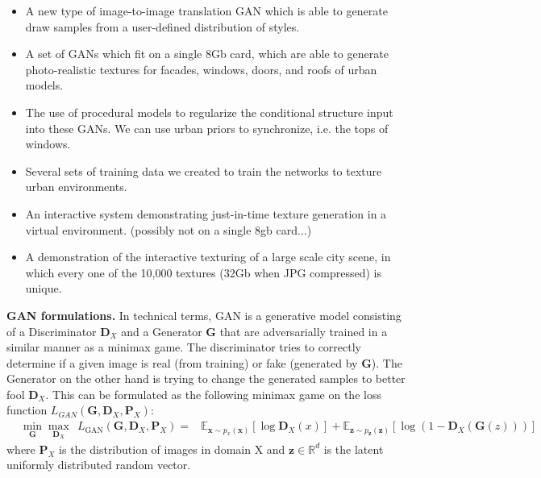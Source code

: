 \begin{itemize}
    \item A new type of image-to-image translation GAN which is able to generate draw samples from a user-defined distribution of styles.
    \item A set of GANs which fit on a single 8Gb card, which are able to generate photo-realistic textures for facades, windows, doors, and roofs of urban models. 
    \item The use of procedural models to regularize the conditional structure input into these GANs. We can use urban priors to synchronize, i.e. the tops of windows.
    \item Several sets of training data we created to train the networks to texture urban environments.
    \item An interactive system demonstrating just-in-time texture generation in a virtual environment. (possibly not on a single 8gb card...)
    \item A demonstration of the interactive texturing of a large scale city scene, in which every one of the 10,000 textures (32Gb when JPG compressed) is unique.
\end{itemize}

\vspace{1in}

{\bf GAN formulations.}
In technical terms, GAN is a generative model consisting of a Discriminator $\mathbf{D}_{X}$ and a Generator $\mathbf{G}$ that are adversarially trained in a similar manner as a minimax game. The discriminator tries to correctly determine if a given image is real (from training) or fake (generated by $\mathbf{G}$). The Generator on the other hand is trying to change the generated samples to better fool $\mathbf{D}_{X}$. This can be formulated as the following minimax game on the loss function $\mathbf{\mathit{L}}_{GAN}(\mathbf{G},\mathbf{D}_{X},\mathbf{P}_{X})$: 
\begin{equation}
\begin{aligned}
&
\min_{\mathbf{G}} \max_{\mathbf{D}_{X}}~~\mathbf{\mathit{L}}_{\text{GAN}}(\mathbf{G},\mathbf{D}_{X},\mathbf{P}_{X})=  
& \mathbb{E}_{\mathbf{x}\sim p_{x}(\mathbf{x})} [\log \mathbf{D}_{X}(x)] +  \mathbb{E}_{\mathbf{z}\sim p_{\mathbf{z}}(\mathbf{z})} [\log (1- \mathbf{D}_{X}(\mathbf{G}(z)))]
\end{aligned}
\label{eq:GAN}
\end{equation}
\noindent where $\mathbf{P}_{X}$ is the distribution of images in domain X and $ \mathbf{z} \in \mathbb{R}^{d}$ is the latent uniformly distributed random vector.